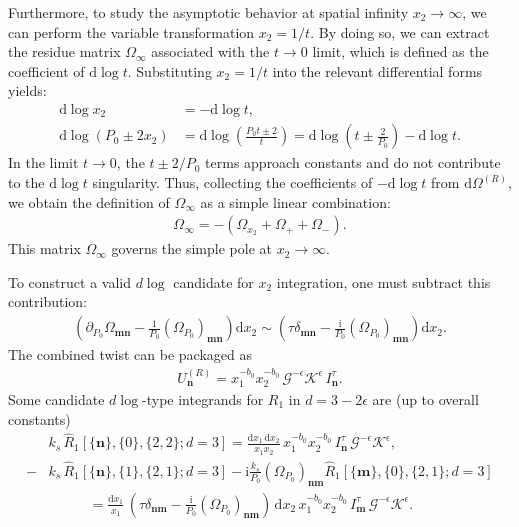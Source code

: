 \documentclass[a4paper]{article}
\newcommand{\n}{\nonumber}
\def\di{{\mathrm{d}}}
\def\ii{\mathrm{i}}
\def\ep{\epsilon}
\newcommand{\mG}{\mathcal{G}}
\newcommand{\mK}{\mathcal{K}}
\def\to{\rightarrow}
\begin{document}
Furthermore, to study the asymptotic behavior at spatial infinity $x_2 \to \infty$, we can perform the variable transformation $x_2 = 1/t$. By doing so, we can extract the residue matrix $\Omega_\infty$ associated with the $t \to 0$ limit, which is defined as the coefficient of $\di\log t$. Substituting $x_2 = 1/t$ into the relevant differential forms yields:
\begin{align}
	\di\log x_2 &= -\di\log t, \n\\
	\di\log(P_0 \pm 2x_2) &= \di\log\left(\frac{P_0 t \pm 2}{t}\right) = \di\log\left(t \pm \frac{2}{P_0}\right) - \di\log t.
\end{align}
In the limit $t \to 0$, the $t \pm 2/P_0$ terms approach constants and do not contribute to the $\di\log t$ singularity. Thus, collecting the coefficients of $-\di\log t$ from $\di\Omega^{(R)}$, we obtain the definition of $\Omega_\infty$ as a simple linear combination:
\begin{align}
	\Omega_\infty = - \left( \Omega_{x_2} + \Omega_{+} + \Omega_{-} \right).
\end{align}
This matrix $\Omega_\infty$ governs the simple pole at $x_2 \to \infty$.



To construct a valid $d\log$ candidate for $x_2$ integration, one must subtract this contribution:
\begin{align}
	\left(\partial_{P_0}\Omega_{\bm m\bm n} - \frac{1}{P_0}(\Omega_{P_0})_{\bm m\bm n}\right) \di x_2 \sim \left( \tau\delta_{\bm m\bm n} - \frac{\ii}{P_0}(\Omega_{P_0})_{\bm m\bm n}\right) \di x_2.
\end{align}
The combined twist can be packaged as
\begin{align}
	U^{(R)}_{\bm n} = x_1^{-b_0}x_2^{-b_0}\,\mG^{-\ep}\mK^{\ep}\,I^{\tau}_{\bm n}.
\end{align}
Some candidate $d\log$-type integrands for $R_1$ in $d=3-2\ep$ are (up to overall constants)
\begin{align}
&	k_s\,\hat{R}_1[\{\bm n\},\{0\},\{2,2\};d=3] = \frac{\di x_1\,\di x_2}{x_1 x_2}\,x_1^{-b_0}x_2^{-b_0}\,I^{\tau}_{\bm n}\,\mG^{-\ep}\mK^{\ep}, \n\\
-	& k_s\,\hat{R}_1[\{\bm n\},\{1\},\{2,1\};d=3] -   \ii	\frac{k_s}{P_0} (\Omega_{P_0})_{\bm n\bm m} \hat{R}_1[\{\bm m\},\{0\},\{2,1\};d=3]     \n\\
& ~~~~~~~~~~~~~= \frac{\di x_1}{x_1}\,\left(\tau\delta_{\bm n\bm m} - \frac{\ii}{P_0}(\Omega_{P_0})_{\bm n\bm m}\right)\,\di x_2 \,x_1^{-b_0}x_2^{-b_0}\,I^{\tau}_{\bm m}\,\mG^{-\ep}\mK^{\ep}.
\end{align}
\end{document}

